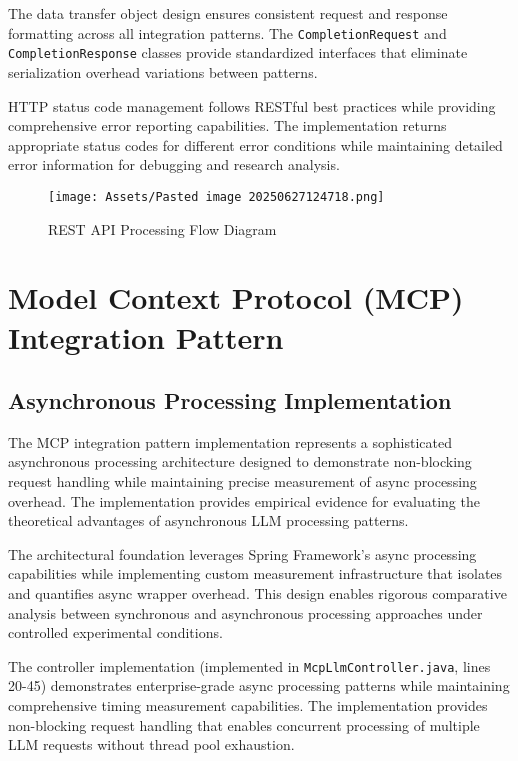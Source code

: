The data transfer object design ensures consistent request and response formatting across all integration patterns. The \texttt{CompletionRequest} and \texttt{CompletionResponse} classes provide standardized interfaces that eliminate serialization overhead variations between patterns.


HTTP status code management follows RESTful best practices while providing comprehensive error reporting capabilities. The implementation returns appropriate status codes for different error conditions while maintaining detailed error information for debugging and research analysis.

\begin{figure}[H]
    \centering
    \texttt{[image: Assets/Pasted image 20250627124718.png]}
    \caption{REST API Processing Flow Diagram}
\end{figure}

\section{Model Context Protocol (MCP) Integration Pattern}

\subsection{Asynchronous Processing Implementation}

The MCP integration pattern implementation represents a sophisticated asynchronous processing architecture designed to demonstrate non-blocking request handling while maintaining precise measurement of async processing overhead. The implementation provides empirical evidence for evaluating the theoretical advantages of asynchronous LLM processing patterns.

The architectural foundation leverages Spring Framework's async processing capabilities while implementing custom measurement infrastructure that isolates and quantifies async wrapper overhead. This design enables rigorous comparative analysis between synchronous and asynchronous processing approaches under controlled experimental conditions.

The controller implementation (implemented in \texttt{McpLlmController.java}, lines 20-45) demonstrates enterprise-grade async processing patterns while maintaining comprehensive timing measurement capabilities. The implementation provides non-blocking request handling that enables concurrent processing of multiple LLM requests without thread pool exhaustion.

